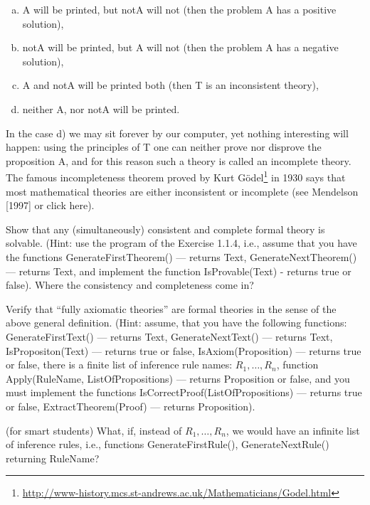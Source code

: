 \begin{enumerate}[(a)]
    \item A will be printed, but notA will not (then the problem A has a positive solution),
    \item notA will be printed, but A will not (then the problem A has a negative solution),
    \item A and notA will be printed both (then T is an inconsistent theory),
    \item neither A, nor notA will be printed.
\end{enumerate}

In the case d) we may sit forever by our computer, yet nothing interesting will happen: using the principles of T one can neither prove nor disprove the proposition A, and for this reason such a theory is called an incomplete theory. The famous incompleteness theorem proved by Kurt G\"{o}del\footnote{\url{http://www-history.mcs.st-andrews.ac.uk/Mathematicians/Godel.html}} in 1930 says that most mathematical theories are either inconsistent or incomplete (see Mendelson [1997] or click here).

\begin{exer}
Show that any (simultaneously) consistent and complete formal theory is solvable. (Hint: use the program of the Exercise 1.1.4, i.e., assume that you have the functions GenerateFirstTheorem() --- returns Text, GenerateNextTheorem() --- returns Text, and implement the function IsProvable(Text) - returns true or false). Where the consistency and completeness come in?
\end{exer}

\begin{exer}
\begin{inparaenum}[(a)]
    \item Verify that ``fully axiomatic theories'' are formal theories in the sense of the above general definition.
    (Hint: assume, that you have the following functions: GenerateFirstText() --- returns Text, GenerateNextText() --- returns Text, IsPropositon(Text) --- returns true or false, IsAxiom(Proposition) --- returns true or false, there is a finite list of inference rule names: \({R_1, \ldots, R_n}\), function Apply(RuleName, ListOfPropositions) --- returns Proposition or false, and you must implement the functions IsCorrectProof(ListOfPropositions) --- returns true or false, ExtractTheorem(Proof) --- returns Proposition).
    \item (for smart students) What, if, instead of \({R_1, \ldots, R_n}\), we would have an infinite list of inference rules, i.e., functions GenerateFirstRule(), GenerateNextRule() returning RuleName?
\end{inparaenum}
\end{exer}

